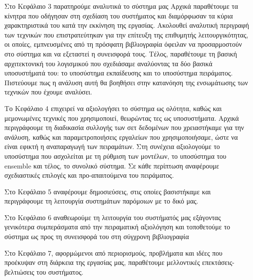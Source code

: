 Στο Κεφάλαιο 3 παρατηρούμε αναλυτικά το σύστημα μας Αρχικά παραθέτουμε τα κίνητρα που οδήγησαν στη σχεδίαση του συστήματος και διαμόρφωσαν τα κύρια χαρακτηριστικά του κατά την εκκίνηση της εργασίας. Ακολουθεί αναλυτική περιγραφή των τεχνικών που επιστρατεύτηκαν για την επίτευξη της επιθυμητής λειτουργικότητας, οι οποίες, εμπνευσμένες από τη πρόσφατη βιβλιογραφία όφειλαν να προσαρμοστούν στο σύστημα και να εξεταστεί η συνεισφορά τους. Τέλος, παραθέτουμε τη βασική αρχιτεκτονική του λογισμικού που σχεδιάσαμε αναλύοντας τα δύο βασικά υποσυστήματά του: το υποσύστημα εκπαίδευσης και το υποσύστημα πειράματος. Πιστεύουμε πως η ανάλυση αυτή θα βοηθήσει στην κατανόηση της ενσωμάτωσης των τεχνικών που έχουμε αναλύσει.

Το Κεφάλαιο 4 επιχειρεί να αξιολογήσει το σύστημα ως ολότητα, καθώς και μεμονωμένες τεχνικές που χρησιμοποιεί, θεωρώντας τες ως υποσυστήματα. Αρχικά περιγράφουμε τη διαδικασία συλλογής των σετ δεδομένων που χρειαστήκαμε για την ανάλυση, καθώς και παραμετροποιήσεις εργαλείων που χρησιμοποιήσαμε, ώστε να είναι εφικτή η αναπαραγωγή των πειραμάτων. Στη συνέχεια αξιολογούμε το υποσύστημα που ασχολείται με τη ρύθμιση των μοντέλων, το υποσύστημα του ensemble και τέλος, το συνολικό σύστημα. Σε κάθε περίπτωση αναφέρουμε σχεδιαστικές επιλογές και προ-απαιτούμενα του πειράματος.

Στο Κεφάλαιο 5 αναφέρουμε δημοσιεύσεις, στις οποίες βασιστήκαμε και περιγράφουμε τη λειτουργία συστημάτων παρόμοιων με το δικό μας.

Στο Κεφάλαιο 6 αναθεωρούμε τη λειτουργία του συστήματός μας εξάγοντας γενικότερα συμπεράσματα από την πειραματική αξιολόγηση και τοποθετούμε το σύστημα ως προς τη συνεισφορά του στη σύγχρονη βιβλιογραφία

Στο Κεφάλαιο 7, αφορμώμενοι από περιορισμούς, προβλήματα και ιδέες που προέκυψαν στη διάρκεια της εργασίας μας, παραθέτουμε μελλοντικές επεκτάσεις-βελτιώσεις του συστήματος.